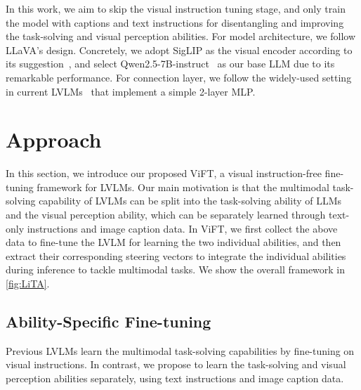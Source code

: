 In this work, we aim to skip the visual instruction tuning stage, and only train the model with captions and text instructions for disentangling and improving the task-solving and visual perception abilities.
For model architecture, we follow LLaVA's design. Concretely, we adopt SigLIP as the visual encoder according to its suggestion~\cite{liu2024llavanext}, and select Qwen2.5-7B-instruct~\cite{yang2024qwen2} as our base LLM due to its remarkable performance.
For connection layer, we follow the widely-used setting in current LVLMs~\cite{liu2024visual,li2024mini} that implement a simple 2-layer MLP.


\section{Approach}


\label{sec:approach}


In this section, we introduce our proposed ViFT, a visual instruction-free fine-tuning framework for LVLMs.
Our main motivation is that the multimodal task-solving capability of LVLMs can be split into the task-solving ability of LLMs and the visual perception ability, which can be separately learned through text-only instructions and image caption data.
In ViFT, we first collect the above data to fine-tune the LVLM for learning the two individual abilities, and then extract their corresponding steering vectors to integrate the individual abilities during inference to tackle multimodal tasks.
We show the overall framework in \autoref{fig:LiTA}. 

\subsection{Ability-Specific Fine-tuning}

Previous LVLMs learn the multimodal task-solving capabilities by fine-tuning on visual instructions. In contrast, we propose to learn the task-solving and visual perception abilities separately, using text instructions and image caption data.

